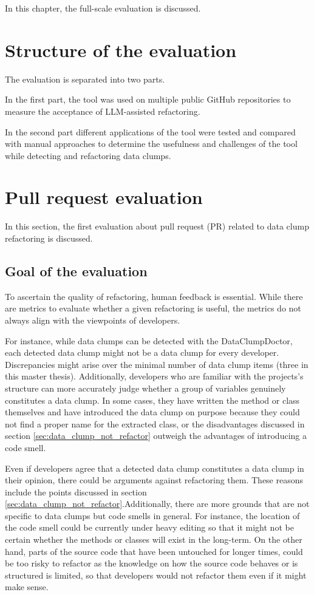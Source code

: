 
In this chapter, the full-scale evaluation is discussed.
\section{Structure of the evaluation}

The evaluation is separated into two parts.

In the first part, the tool was used on multiple public GitHub repositories to measure the acceptance of \ac{LLM}-assisted refactoring.

In the second part different applications of the tool were tested and compared with manual approaches to determine the usefulness and challenges of the tool while detecting and refactoring data clumps.






\section{Pull request evaluation}\label{sec:pull_request_eval}
In this section, the first evaluation about pull request (PR) related to data clump refactoring is discussed. 

\subsection{Goal of the evaluation}

To ascertain the quality of refactoring, human feedback is essential. While there are metrics to evaluate whether a given refactoring is useful, the metrics do not always align with the viewpoints of developers. 

 For instance, while data clumps can be detected with the DataClumpDoctor, each detected data clump might not be a data clump for every developer. Discrepancies might arise over the minimal number of data clump items (three in this master thesis). Additionally, developers who are  familiar with the projects's structure can more accurately judge  whether a group of variables  genuinely constitutes a data clump. In some cases, they have written the method or class themselves and have introduced the data clump on purpose because they could not find a proper name for the extracted class, or the disadvantages discussed in section \ref{sec:data_clump_not_refactor} outweigh the advantages of introducing a code smell. 

Even if developers agree that a detected data clump constitutes a data clump  in their opinion, there could be arguments against refactoring them. These reasons include the points  discussed in section \ref{sec:data_clump_not_refactor}.Additionally, there are more grounds that are not specific to data clumps but code smells in general. For instance, the location of the code smell could be currently under heavy editing so that it might not be certain whether the methods or classes will exist in the long-term. On the other hand, parts of the source code that have been untouched for longer times, could be too risky to refactor as the knowledge on how the source code behaves or is structured is limited, so that developers would not refactor them even if it might make sense. 

